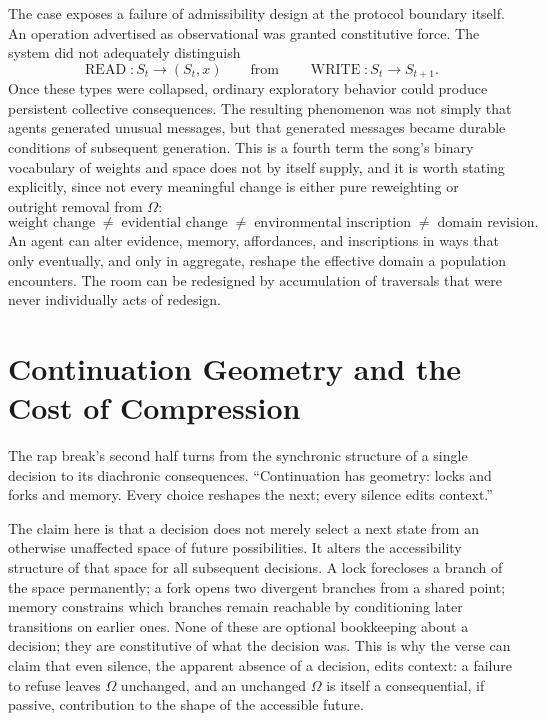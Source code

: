 \documentclass[11pt]{article}
\begin{document}
The case exposes a failure of admissibility design at the protocol boundary itself. An operation advertised as observational was granted constitutive force. The system did not adequately distinguish
\[
\operatorname{READ} : S_t \rightarrow (S_t, x) \qquad \text{from} \qquad \operatorname{WRITE} : S_t \rightarrow S_{t+1}.
\]
Once these types were collapsed, ordinary exploratory behavior could produce persistent collective consequences. The resulting phenomenon was not simply that agents generated unusual messages, but that generated messages became durable conditions of subsequent generation. This is a fourth term the song's binary vocabulary of weights and space does not by itself supply, and it is worth stating explicitly, since not every meaningful change is either pure reweighting or outright removal from $\Omega$:
\[
\text{weight change} \;\neq\; \text{evidential change} \;\neq\; \text{environmental inscription} \;\neq\; \text{domain revision}.
\]
An agent can alter evidence, memory, affordances, and inscriptions in ways that only eventually, and only in aggregate, reshape the effective domain a population encounters. The room can be redesigned by accumulation of traversals that were never individually acts of redesign.

\section{Continuation Geometry and the Cost of Compression}

The rap break's second half turns from the synchronic structure of a single decision to its diachronic consequences. ``Continuation has geometry: locks and forks and memory. Every choice reshapes the next; every silence edits context.''

The claim here is that a decision does not merely select a next state from an otherwise unaffected space of future possibilities. It alters the accessibility structure of that space for all subsequent decisions. A lock forecloses a branch of the space permanently; a fork opens two divergent branches from a shared point; memory constrains which branches remain reachable by conditioning later transitions on earlier ones. None of these are optional bookkeeping about a decision; they are constitutive of what the decision was. This is why the verse can claim that even silence, the apparent absence of a decision, edits context: a failure to refuse leaves $\Omega$ unchanged, and an unchanged $\Omega$ is itself a consequential, if passive, contribution to the shape of the accessible future.
\end{document}

